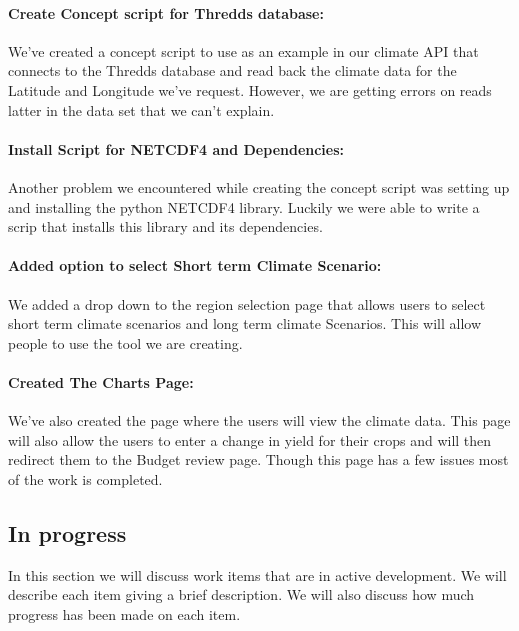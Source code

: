 \documentclass[onecolumn, draftclsnofoot,10pt, compsoc]{article}
\begin{document}
		\paragraph{Create Concept script for Thredds database:} We've created a concept script to use as an example in our climate API that connects to the Thredds database and read back the climate data for the Latitude and Longitude we've request. However, we are getting errors on reads latter in the data set that we can't explain.\\


		\paragraph{Install Script for NETCDF4 and Dependencies:} Another problem we encountered while creating the concept script was setting up and installing the python NETCDF4 library. Luckily we were able to write a scrip that installs this library and its dependencies.\\

		\paragraph{Added option to select Short term Climate Scenario:} We added a drop down to the region selection page that allows users to select short term climate scenarios and long term climate Scenarios. This will allow people to use the tool we are creating.\\

		\paragraph{Created The Charts Page:} We've also created the page where the users will view the climate data. This page will also allow the users to enter a change in yield for their crops and will then redirect them to the Budget review page. Though this page has a few issues most of the work is completed.\\


	\subsection{In progress}
	In this section we will discuss work items that are in active development. We will describe each item giving a brief description. We will also discuss how much progress has been made on each item.\\
\end{document}
